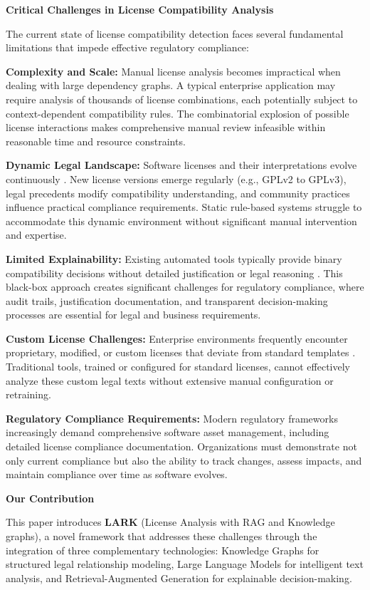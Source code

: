 \textbf{Critical Challenges in License Compatibility Analysis}

The current state of license compatibility detection faces several fundamental limitations that impede effective regulatory compliance:

\textbf{Complexity and Scale:} Manual license analysis becomes impractical when dealing with large dependency graphs. A typical enterprise application may require analysis of thousands of license combinations, each potentially subject to context-dependent compatibility rules. The combinatorial explosion of possible license interactions makes comprehensive manual review infeasible within reasonable time and resource constraints.

\textbf{Dynamic Legal Landscape:} Software licenses and their interpretations evolve continuously \cite{meeker2020open}. New license versions emerge regularly (e.g., GPLv2 to GPLv3), legal precedents modify compatibility understanding, and community practices influence practical compliance requirements. Static rule-based systems struggle to accommodate this dynamic environment without significant manual intervention and expertise.

\textbf{Limited Explainability:} Existing automated tools typically provide binary compatibility decisions without detailed justification or legal reasoning \cite{xu2024licoeval}. This black-box approach creates significant challenges for regulatory compliance, where audit trails, justification documentation, and transparent decision-making processes are essential for legal and business requirements.

\textbf{Custom License Challenges:} Enterprise environments frequently encounter proprietary, modified, or custom licenses that deviate from standard templates \cite{tan2024licensegpt}. Traditional tools, trained or configured for standard licenses, cannot effectively analyze these custom legal texts without extensive manual configuration or retraining.

\textbf{Regulatory Compliance Requirements:} Modern regulatory frameworks increasingly demand comprehensive software asset management, including detailed license compliance documentation. Organizations must demonstrate not only current compliance but also the ability to track changes, assess impacts, and maintain compliance over time as software evolves.

\textbf{Our Contribution}

This paper introduces \textbf{LARK} (License Analysis with RAG and Knowledge graphs), a novel framework that addresses these challenges through the integration of three complementary technologies: Knowledge Graphs for structured legal relationship modeling, Large Language Models for intelligent text analysis, and Retrieval-Augmented Generation for explainable decision-making.

